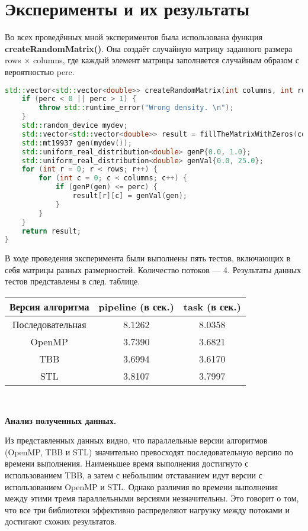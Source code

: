 \documentclass[a4paper, 14pt]{article}
\newcommand{\n}{\par}
\theoremstyle{plain}
\begin{document}
\newpage
\section*{\centering Эксперименты и их результаты}

Во всех проведённых мной экспериментов была использована функция \textbf{createRandomMatrix()}. Она создаёт случайную матрицу заданного размера rows $\times$ columns, где каждый элемент матрицы заполняется случайным образом с вероятностью perc.
\begin{lstlisting}[language=C++,caption=Реализация метода createRandomMatrix()]
std::vector<std::vector<double>> createRandomMatrix(int columns, int rows, double perc) {
	if (perc < 0 || perc > 1) {
		throw std::runtime_error("Wrong density. \n");
	}
	std::random_device mydev;
	std::vector<std::vector<double>> result = fillTheMatrixWithZeros(columns, rows);
	std::mt19937 gen(mydev());
	std::uniform_real_distribution<double> genP{0.0, 1.0};
	std::uniform_real_distribution<double> genVal{0.0, 25.0};
	for (int r = 0; r < rows; r++) {
		for (int c = 0; c < columns; c++) {
			if (genP(gen) <= perc) {
				result[r][c] = genVal(gen);
			}
		}
	}
	return result;
}
\end{lstlisting}

В ходе проведения эксперимента были выполнены пять тестов, включающих в себя матрицы разных размерностей. Количество потоков --- 4.  Результаты данных тестов представлены в след. таблице.

\begin{center}
\begin{tabular}{ ||c | c | c ||  }
	\hline Версия алгоритма & pipeline (в сек.) & task (в сек.)\\ 
	\hline Последовательная & 8.1262 & 8.0358 \\
	\hline OpenMP & 3.7390 & 3.6821 \\
	\hline TBB & 3.6994 & 3.6170 \\ 
	\hline STL & 3.8107 & 3.7997 \\ 
	\hline
\end{tabular}\\[5mm]
\end{center}

\textbf{Анализ полученных данных.}

\noindent Из представленных данных видно, что параллельные версии алгоритмов (OpenMP, TBB и STL) значительно превосходят последовательную версию по времени выполнения. Наименьшее время выполнения достигнуто с использованием TBB, а затем с небольшим отставанием идут версии с использованием OpenMP и STL. Однако различия во времени выполнения между этими тремя параллельными версиями незначительны. Это говорит о том, что все три библиотеки эффективно распределяют нагрузку между потоками и достигают схожих результатов.
\end{document}
